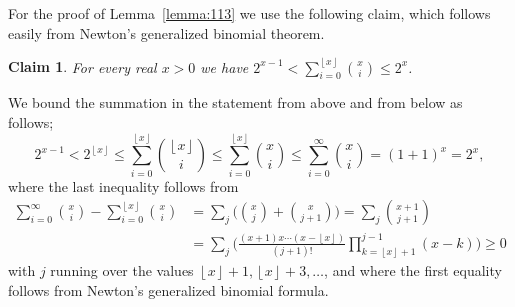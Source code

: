 \documentclass[11pt]{article}
\makeatletter
\renewenvironment{proof}[1][\proofname]
{\par\pushQED{\qed}
	\normalfont\topsep6\p@\@plus6\p@\relax\trivlist
	\item[\hskip\labelsep\bfseries#1\@addpunct{.}]
	\ignorespaces}
{\popQED\endtrivlist\@endpefalse}
\newtheorem{claim}[theo]{Claim}
\newcommand{\floor}[1]{\left\lfloor{#1}\right\rfloor}
\newcommand{\D}{\Delta}
\newcommand{\N}{\mathbb{N}}
\makeatother
\begin{document}
%
%


For the proof of Lemma~\ref{lemma:113} we use the following claim, which follows easily from Newton's generalized binomial theorem.
\begin{claim}\label{claim:Newton}
	For every real $x > 0$ we have $2^{x-1} < \sum_{i=0}^{\floor{x}} \binom{x}{i} \le 2^x$.%
\end{claim}
\begin{proof}
	We bound the summation in the statement from above and from below as follows;
	$$2^{x-1} < 2^{\floor{x}} \le \sum_{i=0}^{\floor{x}} \binom{\floor{x}}{i} 
	\le \sum_{i=0}^{\floor{x}} \binom{x}{i} 
	\le \sum_{i=0}^\infty \binom{x}{i} = (1+1)^x = 2^x ,$$
	where the last inequality follows from
	\begin{align*}
	\sum_{i=0}^\infty \binom{x}{i} - \sum_{i=0}^{\floor{x}} \binom{x}{i} 
	&= \sum_{j} \bigg(\binom{x}{j}+\binom{x}{j+1}\bigg) 
	= \sum_{j} \binom{x+1}{j+1}\\
	&= \sum_{j} \bigg(\frac{(x+1)x\cdots(x-\floor{x})}{(j+1)!} \prod_{k=\floor{x}+1}^{j-1} (x-k) \bigg) \ge 0
	\end{align*}
	with $j$ running over the values $\floor{x}+1,\floor{x}+3,\ldots$, 
	and where the first equality follows from Newton's generalized binomial formula.
\end{proof}
\end{document}
